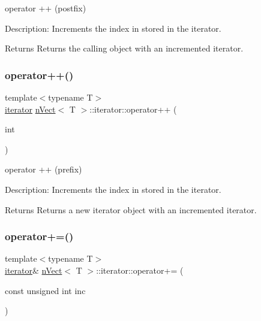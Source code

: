 operator ++ (postfix) 

Description\+: Increments the index in stored in the iterator. \begin{DoxyReturn}{Returns}
Returns the calling object with an incremented iterator. 
\end{DoxyReturn}
\mbox{\label{classnVect_1_1iterator_aa77cebd3d9132f8490609d9522be8b26}} 
\subsubsection{\texorpdfstring{operator++()}{operator++()}\hspace{0.1cm}{\footnotesize\ttfamily [2/2]}}
{\footnotesize\ttfamily template$<$typename T$>$ \\
\hyperlink{classnVect_1_1iterator}{iterator} \hyperlink{classnVect}{n\+Vect}$<$ T $>$\+::iterator\+::operator++ (\begin{DoxyParamCaption}\item[{int}]{ }\end{DoxyParamCaption})\hspace{0.3cm}{\ttfamily [inline]}}



operator ++ (prefix) 

Description\+: Increments the index in stored in the iterator. \begin{DoxyReturn}{Returns}
Returns a new iterator object with an incremented iterator. 
\end{DoxyReturn}
\mbox{\label{classnVect_1_1iterator_abece3b68bb91a0397f58bbdac7996724}} 
\subsubsection{\texorpdfstring{operator+=()}{operator+=()}}
{\footnotesize\ttfamily template$<$typename T$>$ \\
\hyperlink{classnVect_1_1iterator}{iterator}\& \hyperlink{classnVect}{n\+Vect}$<$ T $>$\+::iterator\+::operator+= (\begin{DoxyParamCaption}\item[{const unsigned int}]{inc }\end{DoxyParamCaption})\hspace{0.3cm}{\ttfamily [inline]}}



